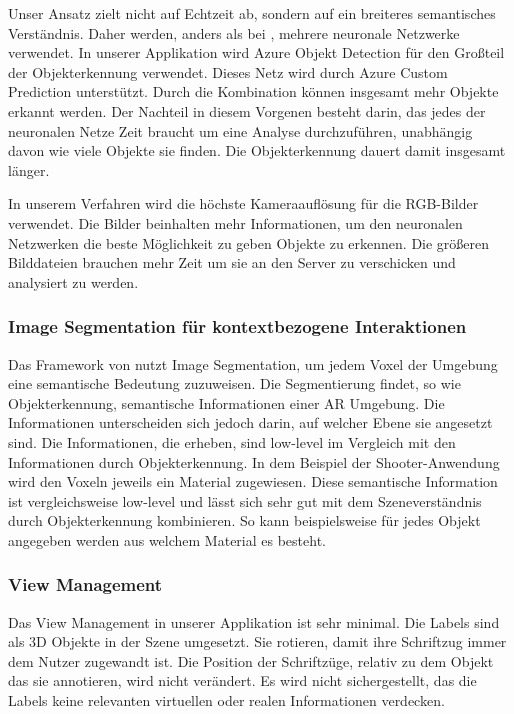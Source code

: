 Unser Ansatz zielt nicht auf Echtzeit ab, sondern auf ein breiteres semantisches Verständnis. Daher werden, anders als bei \cite{LabelingLanguageLearning}, mehrere neuronale Netzwerke verwendet. In unserer Applikation wird Azure Objekt Detection für den Großteil der Objekterkennung verwendet. Dieses Netz wird durch Azure Custom Prediction unterstützt. Durch die Kombination können insgesamt mehr Objekte erkannt werden. Der Nachteil in diesem Vorgenen besteht darin, das jedes der neuronalen Netze Zeit braucht um eine Analyse durchzuführen, unabhängig davon wie viele Objekte sie finden. Die Objekterkennung dauert damit insgesamt länger.

In unserem Verfahren wird die höchste Kameraauflösung für die RGB-Bilder verwendet. Die Bilder beinhalten mehr Informationen, um den neuronalen Netzwerken die beste Möglichkeit zu geben Objekte zu erkennen. Die größeren Bilddateien brauchen mehr Zeit um sie an den Server zu verschicken und analysiert zu werden.\citep{LabelingLanguageLearning}

\subsubsection*{Image Segmentation für kontextbezogene Interaktionen}
Das Framework von \cite{contextawaremixedreality} nutzt Image Segmentation, um jedem Voxel der Umgebung eine semantische Bedeutung zuzuweisen. Die Segmentierung findet, so wie Objekterkennung, semantische Informationen einer AR Umgebung. Die Informationen unterscheiden sich jedoch darin, auf welcher Ebene sie angesetzt sind. Die Informationen, die \cite{contextawaremixedreality} erheben, sind low-level im Vergleich mit den Informationen durch Objekterkennung. In dem Beispiel der Shooter-Anwendung wird den Voxeln jeweils ein Material zugewiesen. Diese semantische Information ist vergleichsweise low-level und lässt sich sehr gut mit dem Szeneverständnis durch Objekterkennung kombinieren. So kann beispielsweise für jedes Objekt angegeben werden aus welchem Material es besteht.\citep{contextawaremixedreality}



\subsubsection*{View Management}
Das View Management in unserer Applikation ist sehr minimal. Die Labels sind als 3D Objekte in der Szene umgesetzt. Sie rotieren, damit ihre Schriftzug immer dem Nutzer zugewandt ist. Die Position der Schriftzüge, relativ zu dem Objekt das sie annotieren, wird nicht verändert. Es wird nicht sichergestellt, das die Labels keine relevanten virtuellen oder realen Informationen verdecken. 

